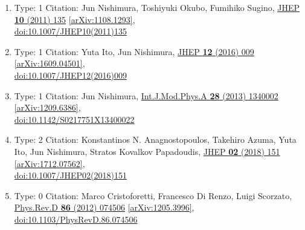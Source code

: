 \documentclass[a4paper,10pt]{article}
\begin{document}
\begin{enumerate}
\begin{enumerate}
  \item Type: 1 Citation: Jun Nishimura, Toshiyuki Okubo, Fumihiko Sugino, \href{https://www.doi.org/10.1007/JHEP10(2011)135}{JHEP {\bf 10} (2011) 135}  \href{https://arxiv.org/abs/1108.1293}{[arXiv:1108.1293]},\\\href{https://www.doi.org/10.1007/JHEP10(2011)135}{doi:10.1007/JHEP10(2011)135}
  \item Type: 1 Citation: Yuta Ito, Jun Nishimura, \href{https://www.doi.org/10.1007/JHEP12(2016)009}{JHEP {\bf 12} (2016) 009}  \href{https://arxiv.org/abs/1609.04501}{[arXiv:1609.04501]},\\\href{https://www.doi.org/10.1007/JHEP12(2016)009}{doi:10.1007/JHEP12(2016)009}
  \item Type: 1 Citation: Jun Nishimura, \href{https://www.doi.org/10.1142/S0217751X13400022}{Int.J.Mod.Phys.A {\bf 28} (2013) 1340002}  \href{https://arxiv.org/abs/1209.6386}{[arXiv:1209.6386]},\\\href{https://www.doi.org/10.1142/S0217751X13400022}{doi:10.1142/S0217751X13400022}
  \item Type: 2 Citation: Konstantinos N. Anagnostopoulos, Takehiro Azuma, Yuta Ito, Jun Nishimura, Stratos Kovalkov Papadoudis, \href{https://www.doi.org/10.1007/JHEP02(2018)151}{JHEP {\bf 02} (2018) 151}  \href{https://arxiv.org/abs/1712.07562}{[arXiv:1712.07562]},\\\href{https://www.doi.org/10.1007/JHEP02(2018)151}{doi:10.1007/JHEP02(2018)151}
  \item Type: 0 Citation: Marco Cristoforetti, Francesco Di Renzo, Luigi Scorzato, \href{https://www.doi.org/10.1103/PhysRevD.86.074506}{Phys.Rev.D {\bf 86} (2012) 074506}  \href{https://arxiv.org/abs/1205.3996}{[arXiv:1205.3996]},\\\href{https://www.doi.org/10.1103/PhysRevD.86.074506}{doi:10.1103/PhysRevD.86.074506}

\end{enumerate}
\end{enumerate}
\end{document}
